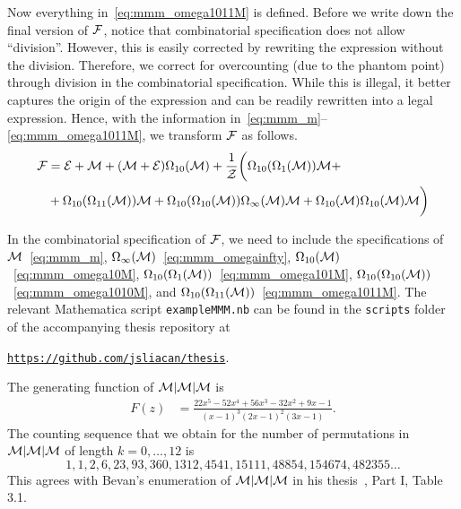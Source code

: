 \documentclass[12pt, a4paper, twoside]{report}
\begin{document}
Now everything in~\eqref{eq:mmm_omega1011M} is defined. Before we write down the final version of $\mathcal{F}$, notice that combinatorial specification does not allow ``division''. However, this is easily corrected by rewriting the expression without the division. Therefore, we correct for overcounting (due to the phantom point) through division in the combinatorial specification. While this is illegal, it better captures the origin of the expression and can be readily rewritten into a legal expression. Hence, with the information in~\eqref{eq:mmm_m}--\eqref{eq:mmm_omega1011M}, we transform $\mathcal{F}$ as follows.
\begin{align*}
  \mathcal{F} &= \mathcal{E} + \mathcal{M} + (\mathcal{M} + \mathcal{E})\Omega_{10}(\mathcal{M}) +\frac{1}{\mathcal{Z}}\bigg(\Omega_{10}(\Omega_1(\mathcal{M}))\mathcal{M} +\\
     &+\Omega_{10}(\Omega_{11}(\mathcal{M}))\mathcal{M} +\Omega_{10}(\Omega_{10}(\mathcal{M}))\Omega_\infty(\mathcal{M})\mathcal{M} + \Omega_{10}(\mathcal{M})\Omega_{10}(\mathcal{M})\mathcal{M}\bigg)
\end{align*}

In the combinatorial specification of $\mathcal{F}$, we need to include the specifications of $\mathcal{M}$~\eqref{eq:mmm_m}, $\Omega_\infty(\mathcal{M})$~\eqref{eq:mmm_omegainfty}, $\Omega_{10}(\mathcal{M})$~\eqref{eq:mmm_omega10M}, $\Omega_{10}(\Omega_1(\mathcal{M}))$~\eqref{eq:mmm_omega101M}, $\Omega_{10}(\Omega_{10}(\mathcal{M}))$~\eqref{eq:mmm_omega1010M}, and $\Omega_{10}(\Omega_{11}(\mathcal{M}))$~\eqref{eq:mmm_omega1011M}. The relevant Mathematica script \texttt{exampleMMM.nb} can be found in the \texttt{scripts} folder of the accompanying thesis repository at

\begin{center}\href{https://github.com/jsliacan/thesis}{\texttt{https://github.com/jsliacan/thesis}}.\end{center}

The generating function of $\mathcal{M}|\mathcal{M}|\mathcal{M}$ is
\begin{align}
  F(z) &= \frac{22x^5-52x^4+56x^3-32x^2+9x-1}{(x-1)^3(2x-1)^2(3x-1)}.
\end{align}
The counting sequence that we obtain for the number of permutations in $\mathcal{M}|\mathcal{M}|\mathcal{M}$ of length $k=0,\ldots,12$ is $$1,1,2,6,23,93,360,1312,4541,15111,48854, 154674,482355\ldots$$
This agrees with Bevan's enumeration of $\mathcal{M}|\mathcal{M}|\mathcal{M}$ in his thesis~\cite{bevan2015thesis}, Part I, Table 3.1.
\end{document}
